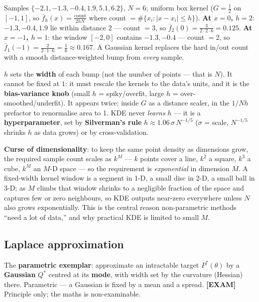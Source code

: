 \documentclass[11pt, a4paper]{article}
\newcommand{\examflag}{\textcolor{tipBd}{\textbf{[EXAM]}}\,}
\newcommand{\kw}[1]{\textbf{#1}}
\begin{document}
\begin{exbox}
Samples $\{-2.1,-1.3,-0.4,1.9,5.1,6.2\}$, $N=6$; uniform box kernel ($G=\tfrac12$ on $[-1,1]$, so
$\bar f_h(x)=\frac{\text{count}}{2hN}$ where count $=\#\{x_i:|x-x_i|\le h\}$).
\kw{At $x=0$, $h=2$}: $-1.3,-0.4,1.9$ lie within distance $2$ — count $=3$, so
$\bar f_2(0)=\frac{3}{2\cdot2\cdot6}=0.125$. \kw{At $x=-1$, $h=1$}: the window $[-2,0]$ contains
$-1.3,-0.4$ — count $=2$, so $\bar f_1(-1)=\frac{2}{2\cdot1\cdot6}=\tfrac16\approx0.167$. A Gaussian
kernel replaces the hard in/out count with a smooth distance-weighted bump from \emph{every} sample.
\end{exbox}

\begin{notebox}
$h$ sets the \kw{width} of each bump (not the number of points — that is $N$). It cannot be fixed at
$1$: it must rescale the kernels to the data's units, and it is the \kw{bias-variance knob} (small
$h$ = spiky/overfit, large $h$ = over-smoothed/underfit). It appears twice: inside $G$ as a distance
scaler, in the $1/Nh$ prefactor to renormalise area to 1. KDE never \emph{learns} $h$ — it is a
\kw{hyperparameter}, set by \kw{Silverman's rule} $h\approx1.06\,\sigma\,N^{-1/5}$ ($\sigma$ = scale,
$N^{-1/5}$ shrinks $h$ as data grows) or by cross-validation.
\end{notebox}

\kw{Curse of dimensionality}: to keep the same point density as dimensions grow, the required sample
count scales as $k^M$ — $k$ points cover a line, $k^2$ a square, $k^3$ a cube, $k^M$ an $M$-D space
— so the requirement is \emph{exponential} in dimension $M$. A fixed-width kernel window is a
segment in 1-D, a small disc in 2-D, a small ball in 3-D; as $M$ climbs that window shrinks to a
negligible fraction of the space and captures few or zero neighbours, so KDE outputs near-zero
everywhere unless $N$ also grows exponentially. This is the central reason non-parametric methods
``need a lot of data,'' and why practical KDE is limited to small $M$.

\subsection{Laplace approximation}

\begin{defbox}
The \kw{parametric exemplar}: approximate an intractable target $P^\ast(\theta)$ by a \kw{Gaussian}
$Q^\ast$ centred at its \kw{mode}, with width set by the curvature (Hessian) there. Parametric — a
Gaussian is fixed by a mean and a spread. \examflag{}Principle only; the maths is non-examinable.
\end{defbox}
\end{document}
